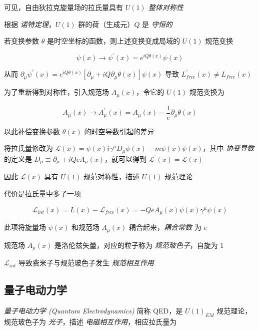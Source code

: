 可见，自由狄拉克旋量场的拉氏量具有 \emph{$U(1)$ 整体对称性}

根据 \emph{诺特定理}，$U(1)$ 群的荷（生成元）$Q$ 是 \emph{守恒的}

若变换参数 $\theta$ 是时空坐标的函数，则上述变换变成局域的 $U(1)$ 规范变换

\begin{equation}
    \psi(x) \to \psi^\prime(x) = e^{iQ\theta(x)} \psi(x)
\end{equation}

从而 $\partial_\mu \psi^\prime(x)=e^{iQ\theta(x)} [\partial_\mu + iQ \partial_\mu \theta(x)] \psi(x)$ 导致 $L_{free}^\prime(x) \ne L_{free}(x)$

为了重新得到对称性，引入规范场 $A_\mu(x)$，令它的 $U(1)$ 规范变换为

\begin{equation}
    A_\mu(x) \to A^\prime_\mu(x) = A_\mu(x) - \frac{1}{e} \partial_\mu \theta(x)
\end{equation}

以此补偿变换参数 $\theta(x)$ 的时空导数引起的差异

将拉氏量修改为 $\mathcal{L}(x) = \overline{\psi}(x) i\gamma^\mu D_\mu \psi(x) - m \overline{\psi}(x) \psi(x)$，其中 \emph{协变导数} 的定义是 $D_\mu \equiv \partial_\mu + iQ e A_\mu(x)$，就可以得到 $\mathcal{L}^\prime(x) = \mathcal{L}(x)$

因此 $\mathcal{L}(x)$ 具有 $U(1)$ 规范对称性，描述 $U(1)$ 规范理论

代价是拉氏量中多了一项

\begin{equation}
    \mathcal{L}_{int}(x) = L(x) - \mathcal{L}_{free}(x) = -Q e A_\mu(x) \overline{\psi}(x) \gamma^\mu \psi(x)
\end{equation}

此项将旋量场 $\psi(x)$ 和规范场 $A_\mu(x)$ 耦合起来，\emph{耦合常数} 为 $e$

规范场 $A_\mu(x)$ 是洛伦兹矢量，对应的粒子称为 \emph{规范玻色子}，自旋为 $1$

$\mathcal{L}_{int}$ 导致费米子与规范玻色子发生 \emph{规范相互作用}

\subsection{量子电动力学}

\emph{量子电动力学 (Quantum Electrodynamics)} 简称 QED，是 $U(1)_{EM}$ 规范理论，规范玻色子为 \emph{光子}，描述 \emph{电磁相互作用}，相应拉氏量为

